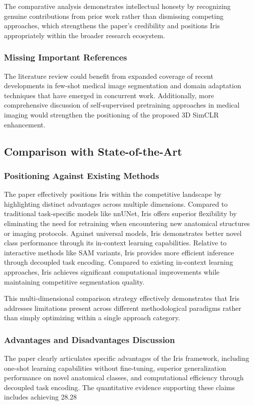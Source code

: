 The comparative analysis demonstrates intellectual honesty by recognizing genuine contributions from prior work rather than dismissing competing approaches, which strengthens the paper's credibility and positions Iris appropriately within the broader research ecosystem.

\subsubsection{Missing Important References}
The literature review could benefit from expanded coverage of recent developments in few-shot medical image segmentation and domain adaptation techniques that have emerged in concurrent work. Additionally, more comprehensive discussion of self-supervised pretraining approaches in medical imaging would strengthen the positioning of the proposed 3D SimCLR enhancement.

\subsection{Comparison with State-of-the-Art}
\subsubsection{Positioning Against Existing Methods}
The paper effectively positions Iris within the competitive landscape by highlighting distinct advantages across multiple dimensions. Compared to traditional task-specific models like nnUNet, Iris offers superior flexibility by eliminating the need for retraining when encountering new anatomical structures or imaging protocols. Against universal models, Iris demonstrates better novel class performance through its in-context learning capabilities. Relative to interactive methods like SAM variants, Iris provides more efficient inference through decoupled task encoding. Compared to existing in-context learning approaches, Iris achieves significant computational improvements while maintaining competitive segmentation quality.

This multi-dimensional comparison strategy effectively demonstrates that Iris addresses limitations present across different methodological paradigms rather than simply optimizing within a single approach category.

\subsubsection{Advantages and Disadvantages Discussion}
The paper clearly articulates specific advantages of the Iris framework, including one-shot learning capabilities without fine-tuning, superior generalization performance on novel anatomical classes, and computational efficiency through decoupled task encoding. The quantitative evidence supporting these claims includes achieving 28.28%

